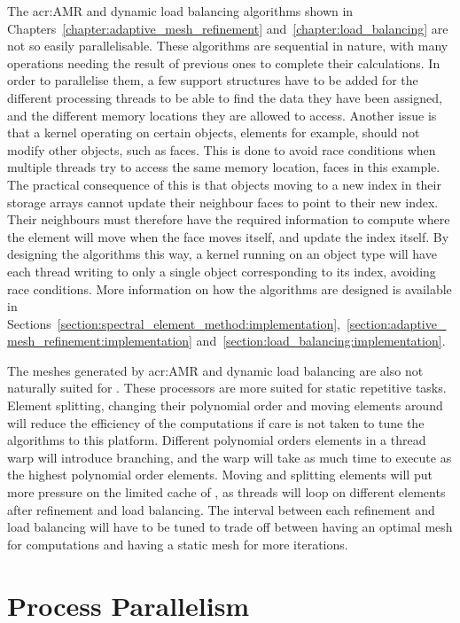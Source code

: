 The \acrlong{acr:AMR} and dynamic load balancing algorithms shown in
Chapters~\ref{chapter:adaptive_mesh_refinement} and~\ref{chapter:load_balancing} are not so easily
parallelisable. These algorithms are sequential in nature, with many operations needing the result
of previous ones to complete their calculations. In order to parallelise them, a few support
structures have to be added for the different processing threads to be able to find the data they
have been assigned, and the different memory locations they are allowed to access. Another issue is
that a kernel operating on certain objects, elements for example, should not modify other objects,
such as faces. This is done to avoid race conditions when multiple threads try to access the same
memory location, faces in this example. The practical consequence of this is that objects moving to
a new index in their storage arrays cannot update their neighbour faces to point to their new index.
Their neighbours must therefore have the required information to compute where the element will move
when the face moves itself, and update the index itself. By designing the algorithms this way, a
kernel running on an object type will have each thread writing to only a single object corresponding
to its index, avoiding race conditions. More information on how the algorithms are designed is
available in
Sections~\ref{section:spectral_element_method:implementation},~\ref{section:adaptive_mesh_refinement:implementation}
and~\ref{section:load_balancing:implementation}.

The meshes generated by \acrlong{acr:AMR} and dynamic load balancing are also not naturally suited
for . These processors are more suited for static repetitive tasks. Element
splitting, changing their polynomial order and moving elements around will reduce the efficiency of
the computations if care is not taken to tune the algorithms to this platform. Different polynomial
orders elements in a thread warp will introduce branching, and the warp will take as much time to
execute as the highest polynomial order elements. Moving and splitting elements will put more
pressure on the limited cache of , as threads will loop on different elements
after refinement and load balancing. The interval between each refinement and load balancing will
have to be tuned to trade off between having an optimal mesh for computations and having a static
mesh for more iterations.

\section{Process Parallelism}\label{section:graphics_processing_units:process_parallelism}

